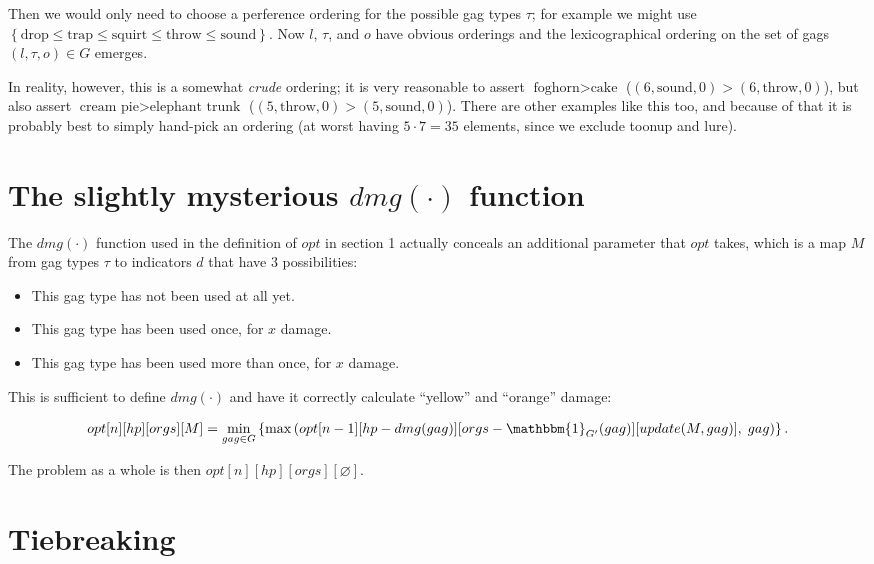 \documentclass[a4paper]{article}
\begin{document}
Then we would only need to choose a perference ordering for the possible gag types $\tau$; for example we might use $\left\{\text{drop} \leq \text{trap} \leq \text{squirt} \leq \text{throw} \leq \text{sound}\right\}$. Now $l$, $\tau$, and $o$ have obvious orderings and the lexicographical ordering on the set of gags $\left(l, \tau, o\right) \in G$ emerges.

In reality, however, this is a somewhat \textit{crude} ordering; it is very reasonable to assert $\text{foghorn} > \text{cake}$ ($\left(6, \text{sound}, 0\right) > \left(6, \text{throw}, 0\right)$), but also assert $\text{cream pie} > \text{elephant trunk}$ ($\left(5, \text{throw}, 0\right) > \left(5, \text{sound}, 0\right)$). There are other examples like this too, and because of that it is probably best to simply hand-pick an ordering (at worst having $5 \cdot 7 = 35$ elements, since we exclude toonup and lure).

\section{The slightly mysterious $dmg(\cdot)$ function}

The $dmg(\cdot)$ function used in the definition of $opt$ in section 1 actually conceals an additional parameter that $opt$ takes, which is a map $M$ from gag types $\tau$ to indicators $d$ that have $3$ possibilities:

\begin{itemize}
  \item This gag type has not been used at all yet.

  \item This gag type has been used once, for $x$ damage.

  \item This gag type has been used more than once, for $x$ damage.
\end{itemize}

This is sufficient to define $dmg(\cdot)$ and have it correctly calculate ``yellow'' and ``orange'' damage:

\[
opt[n][hp][orgs][M] =
  \min_{gag \in G}\left\{\max\left(opt[n - 1][hp - dmg(gag)][orgs - \mathbbm{1}_{G'}(gag)][update(M, gag)], \; gag\right)\right\}.
\]

The problem as a whole is then $opt[n][hp][orgs][\varnothing]$.

\section{Tiebreaking}
\end{document}
